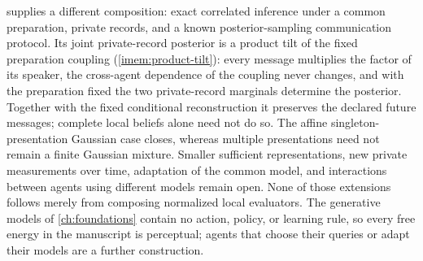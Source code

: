  supplies a different composition: exact correlated inference under a common preparation, private records, and a known posterior-sampling communication protocol. Its joint private-record posterior is a product tilt of the fixed preparation coupling (\cref{imem:product-tilt}): every message multiplies the factor of its speaker, the cross-agent dependence of the coupling never changes, and with the preparation fixed the two private-record marginals determine the posterior. Together with the fixed conditional reconstruction it preserves the declared future messages; complete local beliefs alone need not do so. The affine singleton-presentation Gaussian case closes, whereas multiple presentations need not remain a finite Gaussian mixture. Smaller sufficient representations, new private measurements over time, adaptation of the common model, and interactions between agents using different models remain open. None of those extensions follows merely from composing normalized local evaluators. The generative models of \cref{ch:foundations} contain no action, policy, or learning rule, so every free energy in the manuscript is perceptual; agents that choose their queries or adapt their models are a further construction.

